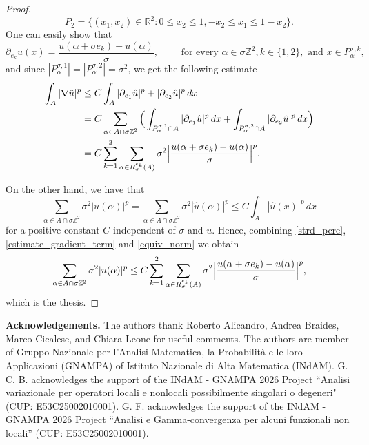 \documentclass{article}
\theoremstyle{plain}
\theoremstyle{definition}
\def\ZZ{{\mathbb Z}}
\newcommand{\s}{\sigma}
\numberwithin{equation}{section}
\begin{document}
\begin{proof}
\begin{equation*}
    \end{equation*}
    \begin{equation*}
        P_2=\{(x_1,x_2) \in \mathbb{R}^{2}: 0\leq x_{2}\leq 1, -x_{2}\leq x_{1}\leq 1-x_{2}\}.
    \end{equation*}
    One can easily show that
    \begin{equation*}
\partial_{e_{k}}\hat{u}(x)=\frac{u(\alpha+\s e_k)-u(\alpha)}{\s}, \qquad \text{ for every } \alpha\in \s\ZZ^2, k\in\{1,2\}, \text{ and }  x\in P^{\s,k}_{\alpha},
    \end{equation*}
and since $|P^{\s,1}_{\alpha}|=|P^{\s,2}_{\alpha}|=\s^{2}$, we get the following estimate
    \begin{align}\notag
\int_{A}|\nabla \hat{u}|^{p}& \leq C \int_{A}|\partial_{e_{1}}\hat{u}|^{p}+|\partial_{e_{2}}\hat{u}|^{p}\,dx\\ \notag & = C \sum_{\alpha \in A\cap \s\mathbb{Z}^{2}}\Big(\int_{P^{\s,1}_{\alpha}\cap A}|\partial_{e_{1}}\hat{u}|^{p}\,dx+\int_{P^{\s,2}_{\alpha}\cap A}|\partial_{e_{2}}\hat{u}|^{p}\,dx\Big)\\ 
&= C\sum_{k=1}^2\sum_{\alpha\in R_\s^{e_k}(A)}\s^{2}\Bigl|\frac{u(\alpha+\s e_k)-u(\alpha)}{\s}\Bigr|^{p}.
\label{estimate_gradient_term}
    \end{align}

On the other hand, we have that 
\begin{equation}\label{equiv_norm}
     \sum_{\alpha \in A \cap \s\mathbb{Z}^2}\s^2|u(\alpha)|^p=\sum_{\alpha \in A \cap \s\mathbb{Z}^2}\s^2|\hat{u}(\alpha)|^p\leq C\int_A |\hat{u}(x)|^p\,dx
\end{equation}
for a positive constant $C$ independent of $\s$ and $u$. Hence, combining \eqref{strd_pcre}, \eqref{estimate_gradient_term} and \eqref{equiv_norm} we obtain 
    \begin{equation*}
        \sum_{\alpha \in A \cap \s\mathbb{Z}^2}\s^2|u(\alpha)|^p\leq  C\sum_{k=1}^2\sum_{\alpha\in R_\s^{e_k}(A)}\s^{2}\Bigl|\frac{u(\alpha+\s e_k)-u(\alpha)}{\s}\Bigr|^{p},
    \end{equation*}
    which is the thesis.
\end{proof}

{\textbf{Acknowledgements.}} 
    The authors thank Roberto Alicandro, Andrea Braides, Marco Cicalese, and Chiara Leone for useful comments. The authors are member of Gruppo Nazionale per l'Analisi Matematica, la Probabilità e le loro Applicazioni (GNAMPA) of Istituto Nazionale di Alta Matematica (INdAM). G. C. B. acknowledges the support of the INdAM - GNAMPA 2026 Project ``Analisi variazionale per operatori locali e nonlocali possibilmente singolari o degeneri" (CUP: E53C25002010001). G. F. acknowledges the support of the INdAM - GNAMPA 2026 Project ``Analisi e Gamma-convergenza per alcuni funzionali non locali” (CUP: E53C25002010001).
    
\end{document}
